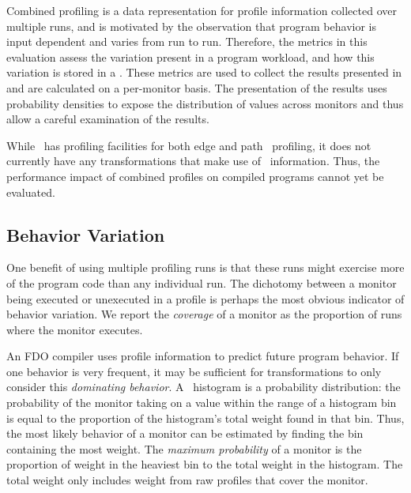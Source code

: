 

Combined profiling is a data representation for profile information
collected over multiple runs, and is motivated by the observation that
program behavior is input dependent and varies from run to run.
Therefore, the metrics in this evaluation assess the variation present
in a program workload, and how this variation is stored in a \CP.
These metrics are used to collect the results presented
in  and are calculated on a per-monitor
basis. The presentation of the results uses probability densities to
expose the distribution of values across monitors and thus allow a
careful examination of the results.

While \llvm\ has profiling facilities for both edge and path \CFG\
profiling, it does not currently have any transformations that make
use of \FDO\ information. Thus, the performance impact of combined
profiles on compiled programs cannot yet be evaluated.

\subsection{Behavior Variation}

One benefit of using multiple profiling runs is that these runs might
exercise more of the program code than any individual run.  The
dichotomy between a monitor being executed or unexecuted in a profile
is perhaps the most obvious indicator of behavior variation.  We
report the {\em coverage} of a monitor as the proportion of runs where
the monitor executes.


An FDO compiler uses profile information to predict future program
behavior. If one behavior is very frequent, it may be sufficient for
transformations to only consider this {\it dominating behavior}.
A \CP\ histogram is a probability distribution: the probability of the
monitor taking on a value within the range of a histogram bin is equal
to the proportion of the histogram's total weight found in that
bin. Thus, the most likely behavior of a monitor can be estimated by
finding the bin containing the most weight.  The {\it maximum
probability} of a monitor is the proportion of weight in the heaviest
bin to the total weight in the histogram.  The total weight only
includes weight from raw profiles that cover the monitor.

